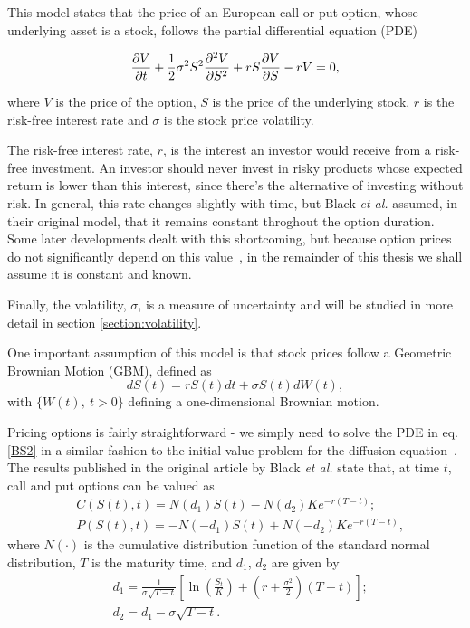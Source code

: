 This model states that the price of an European call or put option, whose underlying asset is a stock, follows the partial differential equation (PDE)

\begin{equation}\label{BS2}
\pdv{V}{t}+\frac{1}{2}\sigma^2S^2\pdv{^2V}{S^2}+rS\pdv{V}{S}-rV=0,
\end{equation}

\noindent where $V$ is the price of the option, $S$ is the price of the underlying stock, $r$ is the risk-free interest rate and $\sigma$ is the stock price volatility.

The risk-free interest rate, $r$, is the interest an investor would receive from a risk-free investment. An investor should never invest in risky products whose expected return is lower than this interest, since there's the alternative of investing without risk. In general, this rate changes slightly with time, but Black \textit{et al.} assumed, in their original model, that it remains constant throghout the option duration. Some later developments dealt with this shortcoming, but because option prices do not significantly depend on this value~\cite{Wilmott}, in the remainder of this thesis we shall assume it is constant and known.

Finally, the volatility, $\sigma$, is a measure of uncertainty and will be studied in more detail in section \ref{section:volatility}.

One important assumption of this model is that stock prices follow a Geometric Brownian Motion (GBM), defined as
\begin{equation}\label{GBM}
dS(t)=rS(t)dt+\sigma S(t)dW(t),
\end{equation}
\noindent with $\{W(t),\ t>0\}$ defining a one-dimensional Brownian motion.


Pricing options is fairly straightforward - we simply need to solve the PDE in eq. \eqref{BS2} in a similar fashion to the initial value problem for the diffusion equation~\cite{Dilao}.
The results published in the original article by Black \textit{et al.} state that, at time $t$, call and put options can be valued as
\begin{equation}\label{callputBS}
\begin{split}
&C(S(t),t)=N(d_1)S(t)-N(d_2)Ke^{-r(T-t)};\\
&P(S(t),t)=-N(-d_1)S(t)+N(-d_2)Ke^{-r(T-t)},
\end{split}
\end{equation}
\noindent where $N(\cdot)$ is the cumulative distribution function of the standard normal distribution, $T$ is the maturity time, and $d_1$, $d_2$ are given by
\begin{equation}\label{d1d2}
\begin{split}
&d_1=\frac{1}{\sigma\sqrt{T-t}}\left[\ln\left(\frac{S_t}{K}\right)+\left(r+\frac{\sigma^2}{2}\right)(T - t)\right];\\
&d_2=d_1-\sigma\sqrt{T-t}.\\
\end{split}
\end{equation}



